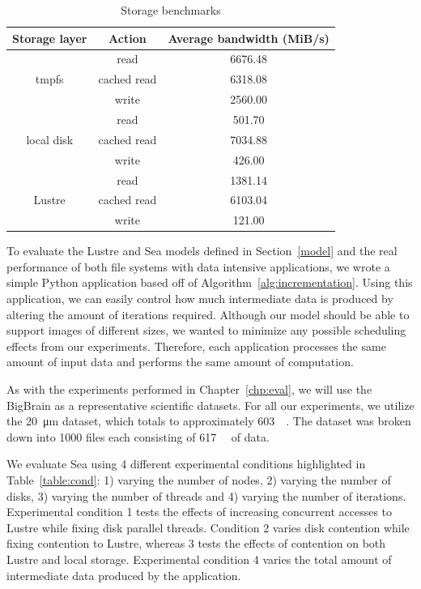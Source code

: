 \documentclass{report}
\begin{document}
    \begin{table}
    \centering
    \begin{tabular}{@{}|c|c|c|@{}} 
     \hline
     Storage layer & Action & Average bandwidth (MiB/s) \\
     \hline
     \multirow{3}{*}{tmpfs} & read & 6676.48 \\
     & cached read & 6318.08  \\
     & write & 2560.00 \\
     \hline
     \multirow{3}{*}{local disk} & read & 501.70  \\
     & cached read & 7034.88 \\
     & write & 426.00 \\
     \hline
     \multirow{3}{*}{Lustre} & read & 1381.14 \\
     & cached read & 6103.04  \\
     & write & 121.00  \\

     \hline

    \end{tabular}
    \caption{Storage benchmarks}
    \label{table:fs}
    \end{table}
    To evaluate the Lustre and Sea models defined in Section~\ref{model} and the real
    performance of both file systems with data intensive applications, we wrote a simple
    Python application based off of Algorithm~\ref{alg:incrementation}.
    Using this application, we can easily control how much intermediate data is produced
    by altering the amount of iterations required. Although our model should be able
    to support images of different sizes, we wanted to minimize any possible
    scheduling effects from our experiments. Therefore, each application
    processes the same amount of input data and performs the same amount of computation.

    As with the experiments performed in Chapter~\ref{chp:eval}, we will use the BigBrain
    as a representative scientific datasets. For all our experiments, we utilize the
    \SI{20}{\micro\meter} dataset, which totals to approximately \SI{603}{\gibi\byte}.
    The dataset was broken down into 1000 files each consisting of \SI{617}{\mebi\byte}
    of data.

    We evaluate Sea using 4 different experimental conditions highlighted in Table~\ref{table:cond}:
    1) varying the number of nodes, 2) varying the number of disks, 3) varying the number of threads and 4)
    varying the number of iterations. Experimental condition 1 tests the effects
    of increasing concurrent accesses to Lustre while fixing disk parallel threads. Condition 2
    varies disk contention while fixing contention to Lustre, whereas 3 tests the effects
    of contention on both Lustre and local storage. Experimental condition
    4 varies the total amount of intermediate data produced by the application.
\end{document}
